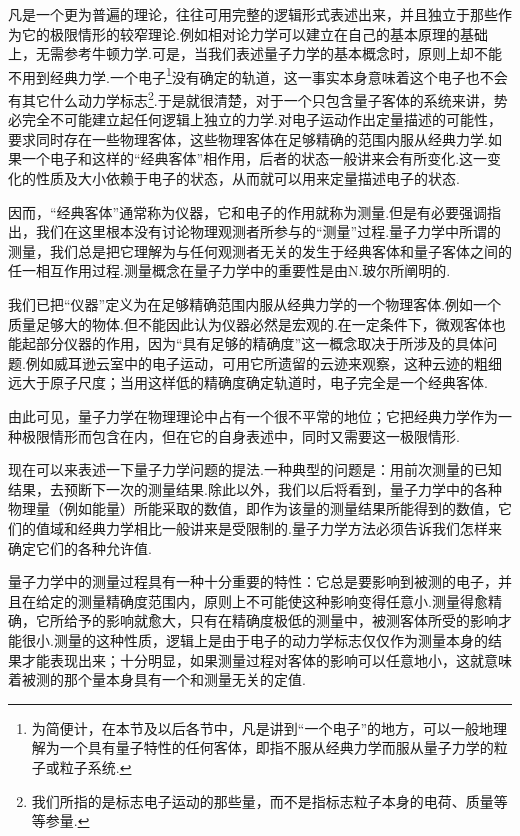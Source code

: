 凡是一个更为普遍的理论，往往可用完整的逻辑形式表述出来，并且独立于那些作为它的极限情形的较窄理论.例如相对论力学可以建立在自己的基本原理的基础上，无需参考牛顿力学.可是，当我们表述量子力学的基本概念时，原则上却不能不用到经典力学.一个电子\footnote{为简便计，在本节及以后各节中，凡是讲到“一个电子”的地方，可以一般地理解为一个具有量子特性的任何客体，即指不服从经典力学而服从量子力学的粒子或粒子系统.}没有确定的轨道，这一事实本身意味着这个电子也不会有其它什么动力学标志\footnote{我们所指的是标志电子运动的那些量，而不是指标志粒子本身的电荷、质量等等参量.}.于是就很清楚，对于一个只包含量子客体的系统来讲，势必完全不可能建立起任何逻辑上独立的力学.对电子运动作出定量描述的可能性，要求同时存在一些物理客体，这些物理客体在足够精确的范围内服从经典力学.如果一个电子和这样的“经典客体”相作用，后者的状态一般讲来会有所变化.这一变化的性质及大小依赖于电子的状态，从而就可以用来定量描述电子的状态.

因而，“经典客体”通常称为仪器，它和电子的作用就称为测量.但是有必要强调指出，我们在这里根本没有讨论物理观测者所参与的“测量”过程.量子力学中所谓的测量，我们总是把它理解为与任何观测者无关的发生于经典客体和量子客体之间的任一相互作用过程.测量概念在量子力学中的重要性是由N.玻尔所阐明的.

我们已把“仪器”定义为在足够精确范围内服从经典力学的一个物理客体.例如一个质量足够大的物体.但不能因此认为仪器必然是宏观的.在一定条件下，微观客体也能起部分仪器的作用，因为“具有足够的精确度”这一概念取决于所涉及的具体问题.例如威耳逊云室中的电子运动，可用它所遗留的云迹来观察，这种云迹的粗细远大于原子尺度；当用这样低的精确度确定轨道时，电子完全是一个经典客体.

由此可见，量子力学在物理理论中占有一个很不平常的地位；它把经典力学作为一种极限情形而包含在内，但在它的自身表述中，同时又需要这一极限情形.

现在可以来表述一下量子力学问题的提法.一种典型的问题是：用前次测量的已知结果，去预断下一次的测量结果.除此以外，我们以后将看到，量子力学中的各种物理量（例如能量）所能采取的数值，即作为该量的测量结果所能得到的数值，它们的值域和经典力学相比一般讲来是受限制的.量子力学方法必须告诉我们怎样来确定它们的各种允许值.

量子力学中的测量过程具有一种十分重要的特性：它总是要影响到被测的电子，并且在给定的测量精确度范围内，原则上不可能使这种影响变得任意小.测量得愈精确，它所给予的影响就愈大，只有在精确度极低的测量中，被测客体所受的影响才能很小.测量的这种性质，逻辑上是由于电子的动力学标志仅仅作为测量本身的结果才能表现出来；十分明显，如果测量过程对客体的影响可以任意地小，这就意味着被测的那个量本身具有一个和测量无关的定值.

